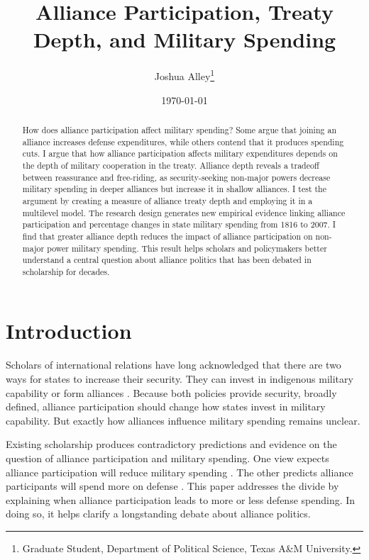 \documentclass[12pt]{article}
\title{\textbf{Alliance Participation, Treaty Depth, and Military Spending}}
\author{Joshua Alley\footnote{Graduate Student,
Department of Political Science, Texas A\&M University.}}
\date{{\normalsize \today}}
\begin{document}
\maketitle 

\doublespace 

\begin{abstract}
How does alliance participation affect military spending? 
Some argue that joining an alliance increases defense expenditures, while others contend that it produces spending cuts.
I argue that how alliance participation affects military expenditures depends on the depth of military cooperation in the treaty. 
Alliance depth reveals a tradeoff between reassurance and free-riding, as security-seeking non-major powers decrease military spending in deeper alliances but increase it in shallow alliances.   
I test the argument by creating a measure of alliance treaty depth and employing it in a multilevel model. 
The research design generates new empirical evidence linking alliance participation and percentage changes in state military spending from 1816 to 2007. 
I find that greater alliance depth reduces the impact of alliance participation on non-major power military spending.  
This result helps scholars and policymakers better understand a central question about alliance politics that has been debated in scholarship for decades. 
\end{abstract}




\section{Introduction}


Scholars of international relations have long acknowledged that there are two ways for states to increase their security. 
They can invest in indigenous military capability or form alliances \citep{Morgenthau1948, Altfield1984, Morrow1993}.
Because both policies provide security, broadly defined, alliance participation should change how states invest in military capability. 
But exactly how alliances influence military spending remains unclear. 


Existing scholarship produces contradictory predictions and evidence on the question of alliance participation and military spending. 
One view expects alliance participation will reduce military spending \citep{Morrow1993, Conybeare1994}. 
The other predicts alliance participants will spend more on defense \citep{Diehl1994, MorganPalmer2006}.
This paper addresses the divide by explaining when alliance participation leads to more or less defense spending. 
In doing so, it helps clarify a longstanding debate about alliance politics.
\end{document}
